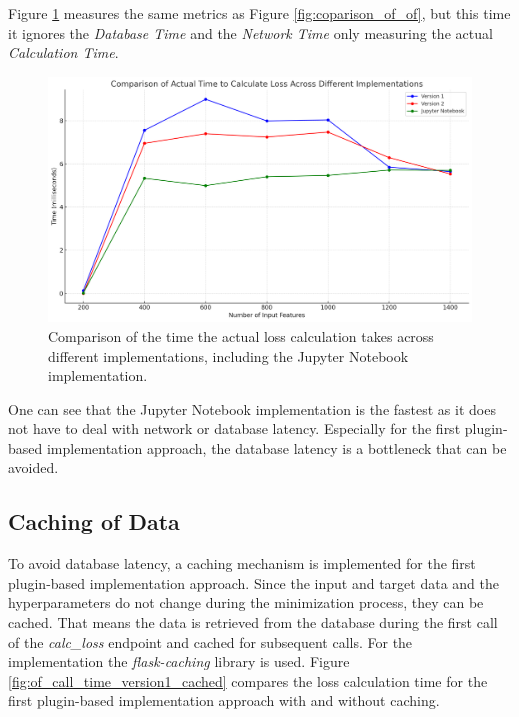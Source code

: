\documentclass[
  a4paper,  %
  twoside,  %
  bibliography=totoc,
  headsepline,
  cleardoublepage=empty,
  parskip=half,
  draft=false
]{scrbook}
\begin{document}
Figure \ref{fig:time_for_of_calc} measures the same metrics as Figure \ref{fig:coparison_of_of}, but this time it ignores the \emph{Database Time} and the \emph{Network Time} only measuring the actual \emph{Calculation Time}.

\begin{figure}
  \centering
  \includegraphics[width=\textwidth]{graphics/time_for_of_calc.png}
  \caption{Comparison of the time the actual loss calculation takes across different implementations, including the Jupyter Notebook implementation.}
  \label{fig:time_for_of_calc}
\end{figure}

One can see that the Jupyter Notebook implementation is the fastest as it does not have to deal with network or database latency.
Especially for the first plugin-based implementation approach, the database latency is a bottleneck that can be avoided.

\subsection{Caching of Data}
\label{subsec:cachingOfData}

To avoid database latency, a caching mechanism is implemented for the first plugin-based implementation approach.
Since the input and target data and the hyperparameters do not change during the minimization process, they can be cached.
That means the data is retrieved from the database during the first call of the \emph{calc\_loss} endpoint and cached for subsequent calls.
For the implementation the \emph{flask-caching} library is used.
Figure \ref{fig:of_call_time_version1_cached} compares the loss calculation time for the first plugin-based implementation approach with and without caching.
\end{document}
